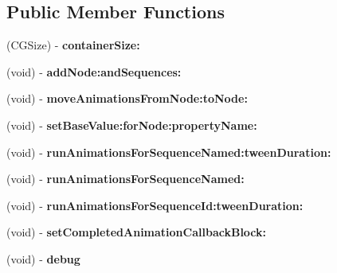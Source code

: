 \subsection*{Public Member Functions}
\begin{DoxyCompactItemize}
\item 
\hypertarget{interface_c_c_b_animation_manager_a29aa97aef853d87bf5c1ea619cb0f1fb}{(C\-G\-Size) -\/ {\bfseries container\-Size\-:}}\label{interface_c_c_b_animation_manager_a29aa97aef853d87bf5c1ea619cb0f1fb}

\item 
\hypertarget{interface_c_c_b_animation_manager_a2b6ca8217fb0cc3396d161981a7c6611}{(void) -\/ {\bfseries add\-Node\-:and\-Sequences\-:}}\label{interface_c_c_b_animation_manager_a2b6ca8217fb0cc3396d161981a7c6611}

\item 
\hypertarget{interface_c_c_b_animation_manager_a355862bc612f6833eb6716cafa438731}{(void) -\/ {\bfseries move\-Animations\-From\-Node\-:to\-Node\-:}}\label{interface_c_c_b_animation_manager_a355862bc612f6833eb6716cafa438731}

\item 
\hypertarget{interface_c_c_b_animation_manager_a95adb78da4efadc888276a77ea0e1e66}{(void) -\/ {\bfseries set\-Base\-Value\-:for\-Node\-:property\-Name\-:}}\label{interface_c_c_b_animation_manager_a95adb78da4efadc888276a77ea0e1e66}

\item 
\hypertarget{interface_c_c_b_animation_manager_ae25859a194e325dbdf69014b1cc593e5}{(void) -\/ {\bfseries run\-Animations\-For\-Sequence\-Named\-:tween\-Duration\-:}}\label{interface_c_c_b_animation_manager_ae25859a194e325dbdf69014b1cc593e5}

\item 
\hypertarget{interface_c_c_b_animation_manager_a093802bf926cff65ac9412203235a8df}{(void) -\/ {\bfseries run\-Animations\-For\-Sequence\-Named\-:}}\label{interface_c_c_b_animation_manager_a093802bf926cff65ac9412203235a8df}

\item 
\hypertarget{interface_c_c_b_animation_manager_ab9606194e4f1d11695fbcd62473b81c4}{(void) -\/ {\bfseries run\-Animations\-For\-Sequence\-Id\-:tween\-Duration\-:}}\label{interface_c_c_b_animation_manager_ab9606194e4f1d11695fbcd62473b81c4}

\item 
\hypertarget{interface_c_c_b_animation_manager_a3610a16d448fd178b6c3a1788445298e}{(void) -\/ {\bfseries set\-Completed\-Animation\-Callback\-Block\-:}}\label{interface_c_c_b_animation_manager_a3610a16d448fd178b6c3a1788445298e}

\item 
\hypertarget{interface_c_c_b_animation_manager_a5023089d8c642408f4f13c8db9b4d191}{(void) -\/ {\bfseries debug}}\label{interface_c_c_b_animation_manager_a5023089d8c642408f4f13c8db9b4d191}

\end{DoxyCompactItemize}
